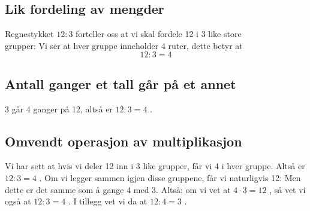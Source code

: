\newpage
\subsection*{Lik fordeling av mengder}
Regnestykket 
$ {12:3} $
forteller oss at vi skal fordele 12 i 3 like store \\grupper:
Vi ser at hver gruppe inneholder 4 ruter, dette betyr at
\[ 12:3=4 \]


\subsection*{Antall ganger et tall går på et annet}
3 går 4 ganger på 12, altså er 
$ 12:3=4 $
\!\!.


\subsection*{Omvendt operasjon av multiplikasjon}
Vi har sett at hvis vi deler 12 inn i 3 like grupper, får vi 4 i hver gruppe. Altså er 
$ 12:3=4$
\!\!. Om vi legger sammen igjen disse gruppene, får vi naturligvis 12: 
Men dette er det samme som å gange 4 med 3. Altså;
om vi vet at 
$ {4\cdot 3=12} $
\!\!, så vet vi også at 
$ {12:3=4} $
\!\!. I tillegg vet vi da at 
$ {12:4=3} $
\!\!. 



